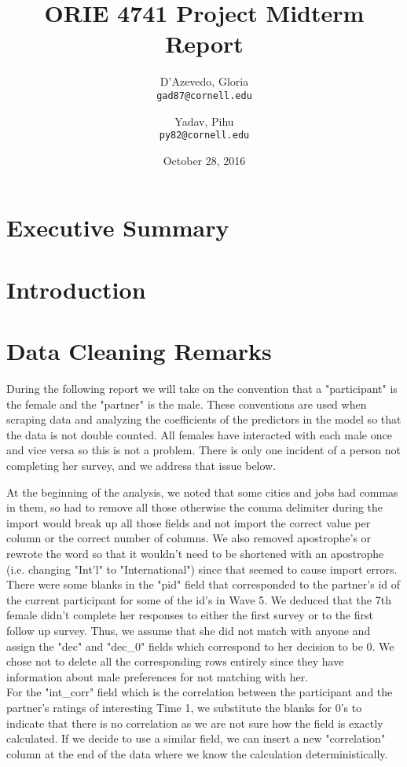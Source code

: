 \documentclass{article}
\title{ORIE 4741 Project Midterm Report}
\author{
  D'Azevedo, Gloria\\
  \texttt{gad87@cornell.edu}
  \and
  Yadav, Pihu\\
  \texttt{py82@cornell.edu}
}
\date{October 28, 2016}
\begin{document}
\maketitle

\section{Executive Summary}

\section{Introduction}

\section{Data Cleaning Remarks}
During the following report we will take on the convention that a "participant" is the female and the "partner" is the male.  These conventions are used when scraping data and analyzing the coefficients of the predictors in the model so that the data is not double counted.  All females have interacted with each male once and vice versa so this is not a problem.  There is only one incident of a person not completing her survey, and we address that issue below.

At the beginning of the analysis, we noted that some cities and jobs had commas in them, so had to remove all those otherwise the comma delimiter during the import would break up all those fields and not import the correct value per column or the correct number of columns.  We also removed apostrophe's  or rewrote the word so that it wouldn't need to be shortened with an apostrophe (i.e. changing "Int'l" to "International") since that seemed to cause import errors.\\

There were some blanks in the "pid" field that corresponded to the partner's id of the current participant for some of the id's in Wave 5. We deduced that the 7th female  didn't complete her responses to either the first survey or to the first follow up survey. Thus, we assume that she did not match with anyone and assign the "dec" and "dec\_0" fields which correspond to her decision to be 0. We chose not to delete all the corresponding rows entirely since they have information about male preferences for not matching with her.\\

For the "int\_corr" field which is the correlation between the participant and the partner's ratings of interesting Time 1, we substitute the blanks for 0's to indicate that there is no correlation as we are not sure how the field is exactly calculated. If we decide to use a similar field, we can insert a new "correlation" column at the end of the data where we know the calculation deterministically.\\
\end{document}
